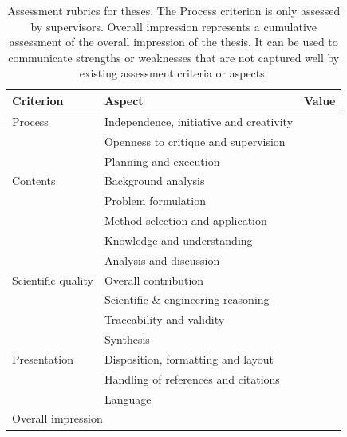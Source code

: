 \documentclass[a4paper,12pt]{book}
\begin{document}
\begin{table}[hbt]
\centering
\caption{Assessment rubrics for theses. The Process
criterion is only assessed by supervisors.
Overall impression represents a cumulative assessment of the
overall impression of the thesis. It can be used to communicate strengths or weaknesses
that are not captured well by existing assessment criteria or aspects.}
\label{tab:bedomning-uppsatser}
\begin{tabular}{|l|l|l|}
\hline
Criterion      & Aspect                                     & Value \\\hline
Process        & Independence, initiative and creativity    &       \\\hline
               & Openness to critique and supervision       &       \\\hline
               & Planning and execution                     &       \\\hline
Contents       & Background analysis                        &       \\\hline
               & Problem formulation                        &       \\\hline
               & Method selection and application           &       \\\hline
               & Knowledge and understanding                &       \\\hline
               & Analysis and discussion                    &       \\\hline
Scientific quality   & Overall contribution                       &       \\\hline
               & Scientific \& engineering reasoning        &       \\\hline
               & Traceability and validity                  &       \\\hline
               & Synthesis                                  &       \\\hline
Presentation   & Disposition, formatting and layout                     &       \\\hline
               & Handling of references and citations       &       \\\hline
               & Language                                   &       \\\hline
\multicolumn{2}{|l|}{Overall impression}                    &       \\
\hline
\end{tabular}
\end{table}
\end{document}
